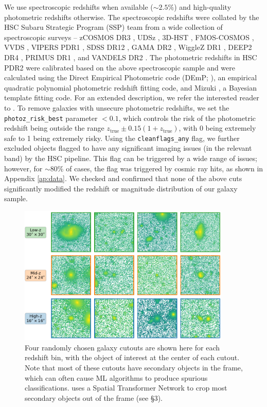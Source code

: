 We use spectroscopic redshifts when available ($\sim 2.5\%$) and high-quality photometric redshifts otherwise. The spectroscopic redshifts were collated by the HSC Subaru Strategic Program (SSP) team from a wide collection of spectroscopic surveys -- zCOSMOS DR3 \citep{lilly_09}, UDSz \citep{bradshaw_13}, 3D-HST \citep{momcheva_16}, FMOS-COSMOS \citep{silverman_15}, VVDS \citep{lefevre_13}, VIPERS PDR1 \citep{garilli_14}, SDSS DR12 \citep{alam_15}, GAMA DR2 \citep{liske_15}, WiggleZ DR1 \citep{drinkwater_10}, DEEP2 DR4 \citep{newman_13}, PRIMUS DR1 \citep{cool_13}, and VANDELS DR2 \citep{vandels}. The photometric redshifts in HSC PDR2 were calibrated based on the above spectroscopic sample and were calculated using the Direct Empirical Photometric code (DEmP; \citeauthor{demp} \citeyear{demp}), an empirical
quadratic polynomial photometric redshift fitting code, and Mizuki \citep{mizuki}, a Bayesian template fitting code. For an extended description, we refer the interested reader to \citet{photoz_hsc_pdr2}. To remove galaxies with unsecure photometric redshifts, we set the \texttt{photoz\_risk\_best} parameter $<0.1$, which controls the risk of the photometric redshift being outside the range $z_{\mathrm{true}} \pm 0.15(1+z_{\mathrm{true}})$, with 0 being extremely safe to 1 being extremely risky. Using the \texttt{cleanflags\_any} flag, we further excluded objects flagged to have any significant imaging issues (in the relevant band) by the HSC pipeline. This flag can be triggered by a wide range of issues; however, for $\sim 80\%$ of cases, the flag was triggered by cosmic ray hits, as shown in Appendix \ref{ap:data}. We checked and confirmed that none of the above cuts significantly modified the redshift or magnitude distribution of our galaxy sample. 

\begin{figure}[htb]
    \centering
    \includegraphics[width = 0.9\textwidth]{real_data_examples.png}
    \caption{Four randomly chosen galaxy cutouts are shown here for each redshift bin, with the object of interest at the center of each cutout. Note that most of these cutouts have secondary objects in the frame, which can often cause ML algorithms to produce spurious classifications. \gampen{} uses a Spatial Transformer Network to crop most secondary objects out of the frame %
    (see \S 3).}
    \label{fig_c3:real_data_eg}
\end{figure}


